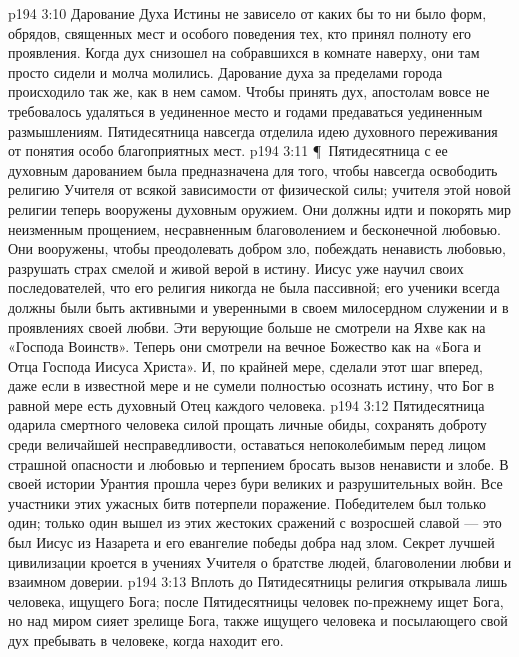 \vs p194 3:10 Дарование Духа Истины не зависело от каких бы то ни было форм, обрядов, священных мест и особого поведения тех, кто принял полноту его проявления. Когда дух снизошел на собравшихся в комнате наверху, они там просто сидели и молча молились. Дарование духа за пределами города происходило так же, как в нем самом. Чтобы принять дух, апостолам вовсе не требовалось удаляться в уединенное место и годами предаваться уединенным размышлениям. Пятидесятница навсегда отделила идею духовного переживания от понятия особо благоприятных мест.
\vs p194 3:11 \P\ Пятидесятница с ее духовным дарованием была предназначена для того, чтобы навсегда освободить религию Учителя от всякой зависимости от физической силы; учителя этой новой религии теперь вооружены духовным оружием. Они должны идти и покорять мир неизменным прощением, несравненным благоволением и бесконечной любовью. Они вооружены, чтобы преодолевать добром зло, побеждать ненависть любовью, разрушать страх смелой и живой верой в истину. Иисус уже научил своих последователей, что его религия никогда не была пассивной; его ученики всегда должны были быть активными и уверенными в своем милосердном служении и в проявлениях своей любви. Эти верующие больше не смотрели на Яхве как на «Господа Воинств». Теперь они смотрели на вечное Божество как на «Бога и Отца Господа Иисуса Христа». И, по крайней мере, сделали этот шаг вперед, даже если в известной мере и не сумели полностью осознать истину, что Бог в равной мере есть духовный Отец каждого человека.
\vs p194 3:12 Пятидесятница одарила смертного человека силой прощать личные обиды, сохранять доброту среди величайшей несправедливости, оставаться непоколебимым перед лицом страшной опасности и любовью и терпением бросать вызов ненависти и злобе. В своей истории Урантия прошла через бури великих и разрушительных войн. Все участники этих ужасных битв потерпели поражение. Победителем был только один; только один вышел из этих жестоких сражений с возросшей славой --- это был Иисус из Назарета и его евангелие победы добра над злом. Секрет лучшей цивилизации кроется в учениях Учителя о братстве людей, благоволении любви и взаимном доверии.
\vs p194 3:13 Вплоть до Пятидесятницы религия открывала лишь человека, ищущего Бога; после Пятидесятницы человек по\hyp{}прежнему ищет Бога, но над миром сияет зрелище Бога, также ищущего человека и посылающего свой дух пребывать в человеке, когда находит его.
